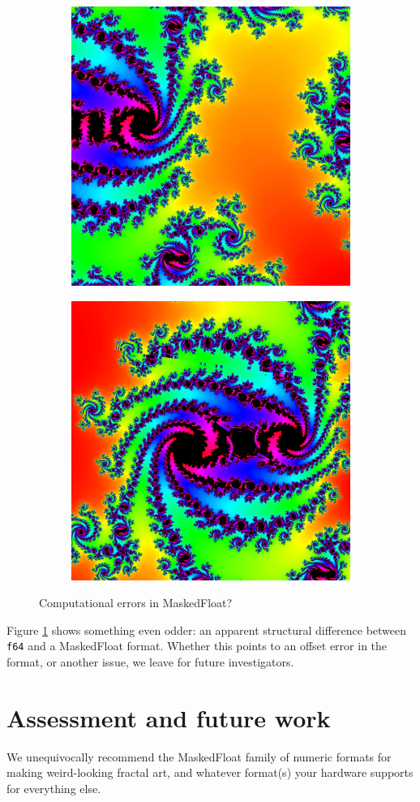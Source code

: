 \documentclass[sigconf,authorversion,nonacm]{acmart}
\begin{document}
\begin{figure}
    \begin{subfigure}[f64]
        \centering
        \includegraphics[width=0.45\linewidth]{images/5-uhhh/f64.png}
    \end{subfigure}
    \quad
    \begin{subfigure}[MaskedFloat<4,50>]
        \centering
        \includegraphics[width=0.45\linewidth]{images/5-uhhh/mf4.png}
    \end{subfigure}
    \quad
    \caption{Computational errors in MaskedFloat?}
    \label{fig:5-uhhh}
\end{figure}

Figure \ref{fig:5-uhhh} shows something even odder: an apparent structural difference between \texttt{f64} and a MaskedFloat format. Whether this points to an offset
error in the format, or another issue, we leave for future investigators.

\setcounter{section}{6}
\section{Assessment and future work}

We unequivocally recommend the MaskedFloat family of numeric formats for making weird-looking fractal art, and whatever format(s) your hardware supports for everything else.
\end{document}

